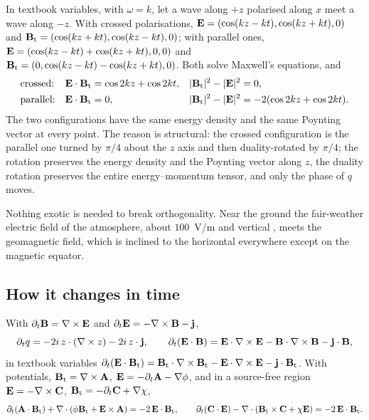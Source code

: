 \begin{example}
\label{ex:counter}
In textbook variables, with $\omega=k$, let a wave along $+z$ polarised along $x$ meet a wave along $-z$. With crossed polarisations,
$\mathbf E=(\cos(kz-kt),\cos(kz+kt),0)$ and $\mathbf B_{\rm t}=(\cos(kz+kt),\cos(kz-kt),0)$; with parallel ones,
$\mathbf E=(\cos(kz-kt)+\cos(kz+kt),0,0)$ and $\mathbf B_{\rm t}=(0,\cos(kz-kt)-\cos(kz+kt),0)$. Both solve Maxwell's equations, and
\[
\begin{aligned}
&\text{crossed:}&& \mathbf E\cdot\mathbf B_{\rm t}=\cos2kz+\cos2kt, && |\mathbf B_{\rm t}|^2-|\mathbf E|^2=0,\\
&\text{parallel:}&& \mathbf E\cdot\mathbf B_{\rm t}=0, && |\mathbf B_{\rm t}|^2-|\mathbf E|^2=-2(\cos2kz+\cos2kt).
\end{aligned}
\]
The two configurations have the same energy density and the same Poynting vector at every point. The reason is structural: the crossed
configuration is the parallel one turned by $\pi/4$ about the $z$ axis and then duality-rotated by $\pi/4$; the rotation preserves the
energy density and the Poynting vector along $z$, the duality rotation preserves the entire energy--momentum tensor, and only the phase
of $q$ moves.
\end{example}

Nothing exotic is needed to break orthogonality. Near the ground the fair-weather electric field of the atmosphere, about $100$~V/m
and vertical \cite{FeynmanII}, meets the geomagnetic field, which is inclined to the horizontal everywhere except on the magnetic
equator.

\subsection{How it changes in time}

\begin{proposition}
\label{prop:EBlocal}
With $\partial_t\mathbf B=\nabla\times\mathbf E$ and $\partial_t\mathbf E=-\nabla\times\mathbf B-\mathbf j$,
\[
\partial_tq=-2i\,z\cdot(\nabla\times z)-2i\,z\cdot\mathbf j,\qquad \partial_t(\mathbf E\cdot\mathbf B)=\mathbf E\cdot\nabla\times\mathbf E-\mathbf B\cdot\nabla\times\mathbf B-\mathbf j\cdot\mathbf B ,
\]
in textbook variables $\partial_t(\mathbf E\cdot\mathbf B_{\rm t})=\mathbf B_{\rm t}\cdot\nabla\times\mathbf B_{\rm t}-\mathbf E\cdot\nabla\times\mathbf E-\mathbf j\cdot\mathbf B_{\rm t}$. With potentials,
$\mathbf B_{\rm t}=\nabla\times\mathbf A$, $\mathbf E=-\partial_t\mathbf A-\nabla\phi$, and in a source-free region $\mathbf E=-\nabla\times\mathbf C$, $\mathbf B_{\rm t}=-\partial_t\mathbf C+\nabla\chi$,
\[
\partial_t(\mathbf A\cdot\mathbf B_{\rm t})+\nabla\cdot(\phi\mathbf B_{\rm t}+\mathbf E\times\mathbf A)=-2\,\mathbf E\cdot\mathbf B_{\rm t},\qquad
\partial_t(\mathbf C\cdot\mathbf E)-\nabla\cdot(\mathbf B_{\rm t}\times\mathbf C+\chi\mathbf E)=-2\,\mathbf E\cdot\mathbf B_{\rm t} .
\]
\end{proposition}


